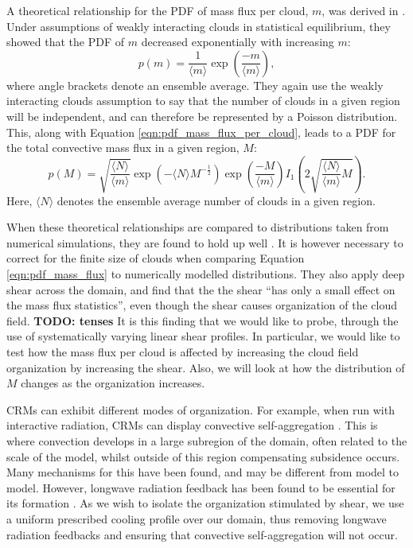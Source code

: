 \documentclass[11pt,a4paper]{article}
\newcommand\todo[1]{\textbf{TODO: #1}}
\begin{document}
A theoretical relationship for the PDF of mass flux per cloud, $m$, was derived in \cite{CC2006I}. Under assumptions of weakly interacting clouds in statistical equilibrium, they showed that the PDF of $m$ decreased exponentially with increasing $m$:
\begin{equation}
    p(m) = \frac{1}{\langle m \rangle} \exp \left(\frac{-m}{\langle m \rangle} \right),
    \label{eqn:pdf_mass_flux_per_cloud}
\end{equation}
where angle brackets denote an ensemble average. They again use the weakly interacting clouds assumption to say that the number of clouds in a given region will be independent, and can therefore be represented by a Poisson distribution. This, along with Equation \ref{eqn:pdf_mass_flux_per_cloud}, leads to a PDF for the total convective mass flux in a given region, $M$:
\begin{equation}
    p(M) = \sqrt{\frac{\langle N \rangle}{\langle m \rangle}} \exp \left( -\langle N \rangle M^{-\frac{1}{2}} \right) \exp \left( \frac{-M}{\langle m \rangle} \right)  I_1\left(2 \sqrt{\frac{\langle N \rangle}{\langle m \rangle} M}\right).
    \label{eqn:pdf_mass_flux}
\end{equation}
Here, $\langle N \rangle$ denotes the ensemble average number of clouds in a given region.

When these theoretical relationships are compared to distributions taken from numerical simulations, they are found to hold up well \parencite{CC2006II}. It is however necessary to correct for the finite size of clouds when comparing Equation \ref{eqn:pdf_mass_flux} to numerically modelled distributions. They also apply deep shear across the domain, and find that the the shear ``has only a small effect on the mass flux statistics'', even though the shear causes organization of the cloud field. \todo{tenses} It is this finding that we would like to probe, through the use of systematically varying linear shear profiles. In particular, we would like to test how the mass flux per cloud is affected by increasing the cloud field organization by increasing the shear. Also, we will look at how the distribution of $M$ changes as the organization increases.

CRMs can exhibit different modes of organization. For example, when run with interactive radiation, CRMs can display convective self-aggregation \parencite{wing2017convective}. 
This is where convection develops in a large subregion of the domain, often related to the scale of the model, whilst outside of this region compensating subsidence occurs. Many mechanisms for this have been found, and may be different from model to model. 
However, longwave radiation feedback has been found to be essential for its formation \parencite{wing2017convective}. As we wish to isolate the organization stimulated by shear, we use a uniform prescribed cooling profile over our domain, thus removing longwave radiation feedbacks and ensuring that convective self-aggregation will not occur.
\end{document}
